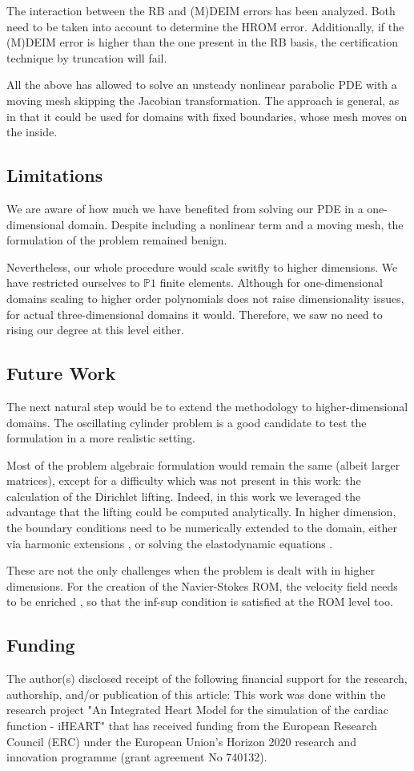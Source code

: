 \documentclass[thesis.tex]{subfiles}
\begin{document}
The interaction between the RB and (M)DEIM errors has been analyzed.
Both need to be taken into account to determine the HROM error.
Additionally, if the (M)DEIM error is higher than the one present in the RB basis,
the certification technique by truncation will fail.

All the above has allowed to solve an unsteady nonlinear parabolic PDE 
with a moving mesh skipping the Jacobian transformation. 
The approach is general, as in that it could be used for domains with fixed boundaries, 
whose mesh moves on the inside.

\subsection{Limitations}
We are aware of how much we have benefited from solving our PDE in a one-dimensional domain.
Despite including a nonlinear term and a moving mesh,
the formulation of the problem remained benign. 

Nevertheless, our whole procedure would scale switfly to higher dimensions.
We have restricted ourselves to $\mathbb{P}1$ finite elements.
Although for one-dimensional domains scaling to higher order polynomials does not
raise dimensionality issues, for actual three-dimensional domains it would.
Therefore, we saw no need to rising our degree at this level either.

\subsection{Future Work}
The next natural step would be to extend the methodology to higher-dimensional domains.
The oscillating cylinder problem is a good candidate 
to test the formulation in a more realistic setting.

Most of the problem algebraic formulation would remain the same (albeit larger matrices),
except for a difficulty which was not present in this work: 
the calculation of the Dirichlet lifting. 
Indeed, in this work we leveraged the advantage that the lifting could be computed analytically.
In higher dimension, the boundary conditions need to be numerically extended to the domain,
either via harmonic extensions
\cite{formaggiaALE},
or solving the elastodynamic equations
\cite{1995_farhat_elasticEquations}.

These are not the only challenges when the problem is dealt with in higher dimensions.
For the creation of the Navier-Stokes ROM, the velocity field needs to be enriched
\cite{supremizers},
so that the inf-sup condition is satisfied at the ROM level too.

\subsection*{Funding}
The author(s) disclosed receipt of the following financial support for the research, 
authorship, and/or publication of this article: 
This work was done
within the research project 
"An Integrated Heart Model for the simulation of the cardiac function - iHEART" 
that has received funding from the European Research Council (ERC) 
under the European Union’s Horizon 2020 research and innovation programme 
(grant agreement No 740132).
\end{document}
